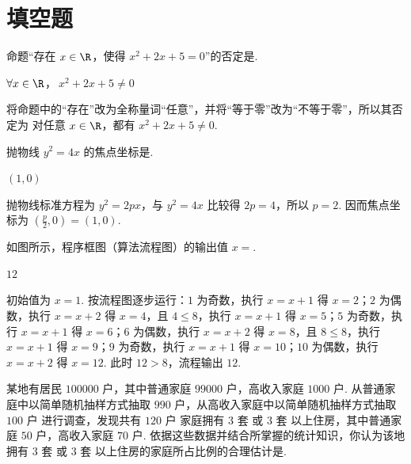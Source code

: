 \section{填空题}

\begin{problem}
命题“存在 \(x \in \R\)，使得 \(x^2 + 2x + 5 = 0\)”的否定是\fillinblank{}.
\end{problem}

\begin{answer}
\(\forall x \in \R\)，\(\ x^2 + 2x + 5 \neq 0\)
\end{answer}

\begin{solution}
将命题中的“存在”改为全称量词“任意”，并将“等于零”改为“不等于零”，所以其否定为
对任意 \(x\in\R\)，都有 \(x^2+2x+5\ne0\).
\end{solution}

\begin{problem}
抛物线 \( y^{2}=4x \) 的焦点坐标是\fillinblank{}.
\end{problem}

\begin{answer}
\((1,0)\)
\end{answer}

\begin{solution}
抛物线标准方程为 \(y^2=2px\)，与 \(y^2=4x\) 比较得 \(2p=4\)，所以 \(p=2\). 因而焦点坐标为
\(\left(\frac p2,0\right)=(1,0)\).
\end{solution}

\begin{problem}
如图所示，程序框图（算法流程图）的输出值 \(x =\)\fillinblank{}.

\end{problem}

\begin{answer}
\(12\)
\end{answer}

\begin{solution}
初始值为 \(x=1\). 按流程图逐步运行：\(1\) 为奇数，执行 \(x=x+1\) 得 \(x=2\)；\(2\) 为偶数，执行 \(x=x+2\) 得 \(x=4\)，且 \(4\leqslant8\)，执行 \(x=x+1\) 得 \(x=5\)；\(5\) 为奇数，执行 \(x=x+1\) 得 \(x=6\)；\(6\) 为偶数，执行 \(x=x+2\) 得 \(x=8\)，且 \(8\leqslant8\)，执行 \(x=x+1\) 得 \(x=9\)；\(9\) 为奇数，执行 \(x=x+1\) 得 \(x=10\)；\(10\) 为偶数，执行 \(x=x+2\) 得 \(x=12\). 此时 \(12>8\)，流程输出 \(12\).
\end{solution}

\begin{problem}
某地有居民 \(100000\text{ 户}\)，其中普通家庭 \(99000\text{ 户}\)，高收入家庭 \(1000\text{ 户}\). 从普通家庭中以简单随机抽样方式抽取 \(990\text{ 户}\)，从高收入家庭中以简单随机抽样方式抽取 \(100\text{ 户}\) 进行调查，发现共有 \(120\text{ 户}\) 家庭拥有 \(3\text{ 套}\) 或 \(3\text{ 套}\) 以上住房，其中普通家庭 \(50\text{ 户}\)，高收入家庭 \(70\text{ 户}\). 依据这些数据并结合所掌握的统计知识，你认为该地拥有 \(3\text{ 套}\) 或 \(3\text{ 套}\) 以上住房的家庭所占比例的合理估计是\fillinblank{}.
\end{problem}


